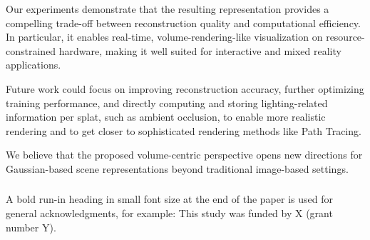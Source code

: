 \documentclass[runningheads]{llncs}
\begin{document}
Our experiments demonstrate that the resulting representation provides a compelling trade-off between reconstruction quality and computational efficiency. In particular, it enables real-time, volume-rendering-like visualization on resource-constrained hardware, making it well suited for interactive and mixed reality applications.

Future work could focus on improving reconstruction accuracy, further optimizing training performance, and directly computing and storing lighting-related information per splat, such as ambient occlusion, to enable more realistic rendering and to get closer to sophisticated rendering methods like Path Tracing.

We believe that the proposed volume-centric perspective opens new directions for Gaussian-based scene representations beyond traditional image-based settings.

\begin{credits}
\subsubsection{\ackname} A bold run-in heading in small font size at the end of the paper is
used for general acknowledgments, for example: This study was funded
by X (grant number Y).

\end{credits}





\end{document}
